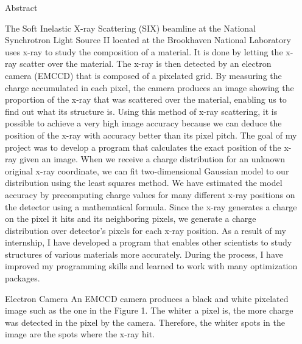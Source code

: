 \documentclass[final]{beamer}
\newlength{\sepwidth}
\newlength{\colwidth}
\newcommand{\separatorcolumn}{\begin{column}{\sepwidth}\end{column}}
\begin{document}
\begin{frame}[t]
\begin{columns}[t]
\separatorcolumn

\begin{column}{\colwidth}

  \begin{block}{Abstract}

    The Soft Inelastic X-ray Scattering (SIX) beamline at the National Synchrotron Light Source II located at the Brookhaven National Laboratory uses x-ray to study the composition of a material. It is done by letting the x-ray scatter over the material. The x-ray is then detected by an electron camera (EMCCD) that is composed of a pixelated grid. By measuring the charge accumulated in each pixel, the camera produces an image showing the proportion of the x-ray that was scattered over the material, enabling us to find out what its structure is. Using this method of x-ray scattering, it is possible to achieve a very high image accuracy because we can deduce the position of the x-ray with accuracy better than its pixel pitch. The goal of my project was to develop a program that calculates the exact position of the x-ray given an image. When we receive a charge distribution for an unknown original x-ray coordinate, we can fit two-dimensional Gaussian model to our distribution using the least squares method. We have estimated the model accuracy by precomputing charge values for many different x-ray positions on the detector using a mathematical formula. Since the x-ray generates a charge on the pixel it hits and its neighboring pixels, we generate a charge distribution over detector’s pixels for each x-ray position. As a result of my internship, I have developed a program that enables other scientists to study structures of various materials more accurately. During the process, I have improved my programming skills and learned to work with many optimization packages.

  \end{block}

  
  \begin{block}{Electron Camera}
    An EMCCD camera produces a black and white pixelated image such as the one in the Figure 1. The whiter a pixel is, the more charge was detected in the pixel by the camera. Therefore, the whiter spots in the image are the spots where the x-ray hit.


\end{block}
\end{column}
\end{columns}
\end{frame}
\end{document}
